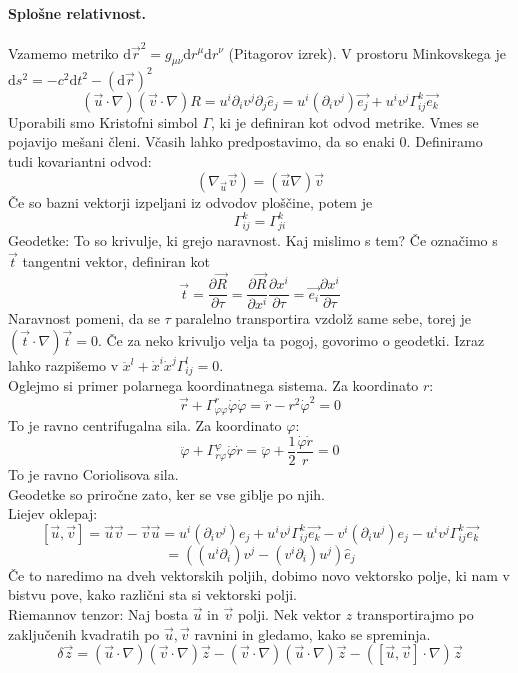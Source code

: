 \documentclass[a4paper]{article}
\newcommand{\vct}[1]{\overrightarrow{#1}}
\newcommand{\dif}{\mathrm{d}}
\newcommand{\pd}[2]{\frac{\partial {#1}}{\partial {#2}}}
\begin{document}
\paragraph{Splošne relativnost.} Vzamemo metriko $\dif\vct{r}^2 = g_{\mu\nu} \dif r^\mu \dif r^\nu$ (Pitagorov izrek).
V prostoru Minkovskega je $\dif s^2 = -c^2\dif t^2 - (\dif\vct{r})^2$ \\
$$(\vct{u}\cdot\nabla)(\vct{v}\cdot\nabla) R = u^i\partial_i v^j\partial_j\hat{e}_j = u^i\left(\partial_iv^j\right)\vct{e_j} + u^iv^j\Gamma^k_{ij}\vct{e_k}$$
Uporabili smo Kristofni simbol $\Gamma$, ki je definiran kot odvod metrike.
Vmes se pojavijo mešani členi. Včasih lahko predpostavimo, da so enaki 0.
Definiramo tudi kovariantni odvod:
$$(\nabla_{\vct{u}} \vct{v}) = (\vct{u}\nabla)\vct{v}$$
Če so bazni vektorji izpeljani iz odvodov ploščine, potem je $$\Gamma_{ij}^k = \Gamma_{ji}^k$$
Geodetke: To so krivulje, ki grejo naravnost. Kaj mislimo s tem?
Če označimo s $\vct{t}$ tangentni vektor, definiran kot $$\vct{t} = \pd{\vct{R}}{\tau} = \pd{\vct{R}}{x^i}\pd{x^i}{\tau} = \vct{e_i}\pd{x^i}{\tau}$$
Naravnost pomeni, da se $\tau$ paralelno transportira vzdolž same sebe, torej je $(\vct{t}\cdot\nabla)\vct{t} = 0$. Če za neko krivuljo velja ta pogoj, govorimo o geodetki.
Izraz lahko razpišemo v $\ddot{x}^l + \dot{x}^i\dot{x}^j\Gamma_{ij}^l = 0$. \\
Oglejmo si primer polarnega koordinatnega sistema. Za koordinato $r$:
$$\vct{r} + \Gamma_{\varphi\varphi}^r\dot{\varphi}\dot{\varphi} = \ddot{r} - r^2\dot{\varphi}^2 = 0$$
To je ravno centrifugalna sila. Za koordinato $\varphi$:
$$\ddot\varphi + \Gamma^\varphi_{r\varphi} \dot\varphi\dot r = \ddot{\varphi} + \frac{1}{2}\frac{\dot\varphi\dot r}{r} = 0$$
To je ravno Coriolisova sila. \\
Geodetke so priročne zato, ker se vse giblje po njih. \\[3mm]
Liejev oklepaj: $$[\vct{u}, \vct{v}] = \vct{u}\vct{v} - \vct{v}\vct{u} = u^i(\partial_iv^j)e_j + u^iv^j\Gamma^k_{ij}\vct{e_k} - v^i(\partial_iu^j)e_j - u^iv^j\Gamma^k_{ij}\vct{e_k}$$
$$= \left((u^i\partial_i)v^j - (v^i\partial_i)u^j\right)\hat{e}_j$$
Če to naredimo na dveh vektorskih poljih, dobimo novo vektorsko polje, ki nam v bistvu pove, kako različni sta si vektorski polji. \\[3mm]
Riemannov tenzor: Naj bosta $\vct{u}$ in $\vct{v}$ polji. Nek vektor $z$ transportirajmo po zaključenih kvadratih po $\vct{u}, \vct{v}$ ravnini in gledamo, kako se spreminja.
$$\delta \vct{z} = (\vct{u}\cdot\nabla)(\vct{v}\cdot\nabla)\vct{z} - (\vct{v}\cdot\nabla)(\vct{u}\cdot\nabla)\vct{z} - \left([\vct{u}, \vct{v}]\cdot\nabla\right)\vct{z}$$
\end{document}
